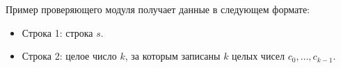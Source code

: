 Пример проверяющего модуля получает данные в следующем формате:
\begin{itemize}
\item Строка 1: строка $s$.
\item Строка 2: целое число $k$, за которым записаны $k$ целых чисел $c_0, \ldots, c_{k - 1}$.
\end{itemize}